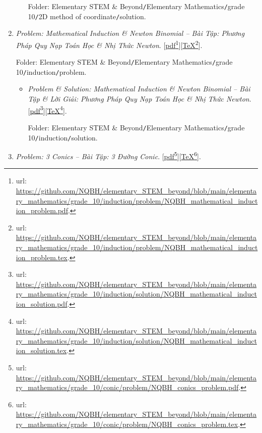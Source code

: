 \documentclass[12pt,oneside]{book}
\begin{document}
\begin{enumerate}
\begin{itemize}
		Folder: {\sf Elementary STEM \& Beyond{\tt/}Elementary Mathematics{\tt/}grade 10{\tt/}2D method of coordinate{\tt/}solution}.
	\end{itemize}
	\item {\it Problem: Mathematical Induction \& Newton Binomial -- Bài Tập: Phương Pháp Quy Nạp Toán Học \& Nhị Thức Newton}. [\href{https://github.com/NQBH/elementary_STEM_beyond/blob/main/elementary_mathematics/grade_10/induction/problem/NQBH_mathematical_induction_problem.pdf}{pdf}\footnote{{\sc url}: \url{https://github.com/NQBH/elementary_STEM_beyond/blob/main/elementary_mathematics/grade_10/induction/problem/NQBH_mathematical_induction_problem.pdf}.}][\href{https://github.com/NQBH/elementary_STEM_beyond/blob/main/elementary_mathematics/grade_10/induction/problem/NQBH_mathematical_induction_problem.tex}{\TeX}\footnote{{\sc url}: \url{https://github.com/NQBH/elementary_STEM_beyond/blob/main/elementary_mathematics/grade_10/induction/problem/NQBH_mathematical_induction_problem.tex}.}].
	
	Folder: {\sf Elementary STEM \& Beyond{\tt/}Elementary Mathematics{\tt/}grade 10{\tt/}induction{\tt/}problem}.
	\begin{itemize}
		\item {\it Problem \& Solution: Mathematical Induction \& Newton Binomial -- Bài Tập \& Lời Giải: Phương Pháp Quy Nạp Toán Học \& Nhị Thức Newton}. [\href{https://github.com/NQBH/elementary_STEM_beyond/blob/main/elementary_mathematics/grade_10/induction/solution/NQBH_mathematical_induction_solution.pdf}{pdf}\footnote{{\sc url}: \url{https://github.com/NQBH/elementary_STEM_beyond/blob/main/elementary_mathematics/grade_10/induction/solution/NQBH_mathematical_induction_solution.pdf}.}][\href{https://github.com/NQBH/elementary_STEM_beyond/blob/main/elementary_mathematics/grade_10/induction/solution/NQBH_mathematical_induction_solution.tex}{\TeX}\footnote{{\sc url}: \url{https://github.com/NQBH/elementary_STEM_beyond/blob/main/elementary_mathematics/grade_10/induction/solution/NQBH_mathematical_induction_solution.tex}.}].
		
		Folder: {\sf Elementary STEM \& Beyond{\tt/}Elementary Mathematics{\tt/}grade 10{\tt/}induction{\tt/}solution}.
	\end{itemize}
	\item {\it Problem: 3 Conics -- Bài Tập: 3 Đường Conic}. [\href{https://github.com/NQBH/elementary_STEM_beyond/blob/main/elementary_mathematics/grade_10/conic/problem/NQBH_conics_problem.pdf}{pdf}\footnote{{\sc url}: \url{https://github.com/NQBH/elementary_STEM_beyond/blob/main/elementary_mathematics/grade_10/conic/problem/NQBH_conics_problem.pdf}.}][\href{https://github.com/NQBH/elementary_STEM_beyond/blob/main/elementary_mathematics/grade_10/conic/problem/NQBH_conics_problem.tex}{\TeX}\footnote{{\sc url}: \url{https://github.com/NQBH/elementary_STEM_beyond/blob/main/elementary_mathematics/grade_10/conic/problem/NQBH_conics_problem.tex}.}].
	

\end{enumerate}
\end{document}
